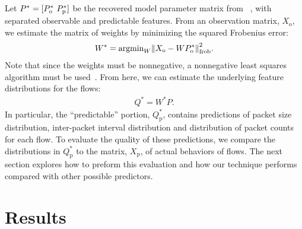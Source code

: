 \documentclass[conference]{IEEEtran}
\begin{document}
Let $P^* = {[P^*_\text{o}~P^*_\text{p}]}$ be the recovered model parameter matrix from ~, with separated observable and predictable features.\separationnote
From an observation matrix, $X_\text{o}$, we estimate the matrix of weights by minimizing the squared Frobenius error:
\begin{align}
  W^* = \text{argmin}_W {{\left\lVert X_\text{o} - W P^*_\text{o}\right\rVert}^2_\text{frob}}.
\end{align}
Note that since the weights must be nonnegative, a nonnegative least squares algorithm must be used~\cite{Benthem04,Kim08:block-pivot}.
From here, we can estimate the underlying feature distributions for the flows:
\begin{align}
  Q^* = W^*P.
\end{align}
In particular, the ``predictable'' portion, $Q^*_\text{p}$, contains predictions of packet size distribution, inter-packet interval distribution and distribution of packet counts for each flow.
To evaluate the quality of these predictions, we compare the distributions in $Q^*_\text{p}$ to the matrix, $X_\text{p}$, of actual behaviors of flows.
The next section explores how to preform this evaluation and how our technique performs compared with other possible predictors. 

\section{Results}
\end{document}
